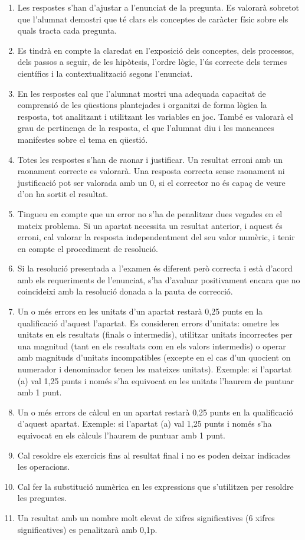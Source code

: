 \begin{enumerate}
  \item Les respostes s'han d'ajustar a l'enunciat de la pregunta. Es valorarà sobretot que l'alumnat demostri que té clars els conceptes de caràcter físic sobre els quals tracta cada pregunta.
  \item Es tindrà en compte la claredat en l'exposició dels conceptes, dels processos, dels passos a seguir, de les hipòtesis, l'ordre lògic, l'ús correcte dels termes científics i la contextualització segons l'enunciat.
  \item En les respostes cal que l'alumnat mostri una adequada capacitat de comprensió de les qüestions plantejades i organitzi de forma lògica la resposta, tot analitzant i utilitzant les variables en joc. També es valorarà el grau de pertinença de la resposta, el que l'alumnat diu i les mancances manifestes sobre el tema en qüestió.
  \item Totes les respostes s'han de raonar i justificar. Un resultat erroni amb un raonament correcte es valorarà. Una resposta correcta sense raonament ni justificació pot ser valorada amb un 0, si el corrector no és capaç de veure d'on ha sortit el resultat.
  \item Tingueu en compte que un error no s'ha de penalitzar dues vegades en el mateix problema. Si un apartat necessita un resultat anterior, i aquest és erroni, cal valorar la resposta independentment del seu valor numèric, i tenir en compte el procediment de resolució.
  \item Si la resolució presentada a l'examen és diferent però correcta i està d'acord amb els requeriments de l'enunciat, s'ha d'avaluar positivament encara que no coincideixi amb la resolució donada a la pauta de correcció.
  \item Un o més errors en les unitats d'un apartat restarà 0,25 punts en la qualificació d'aquest l'apartat. Es consideren errors d'unitats: ometre les unitats en els resultats (finals o intermedis), utilitzar unitats incorrectes per una magnitud (tant en els resultats com en els valors intermedis) o operar amb magnituds d'unitats incompatibles (excepte en el cas d'un quocient on numerador i denominador tenen les mateixes unitats). Exemple: si l'apartat (a) val 1,25 punts i només s'ha equivocat en les unitats l'haurem de puntuar amb 1 punt.
  \item Un o més errors de càlcul en un apartat restarà 0,25 punts en la qualificació d'aquest apartat. Exemple: si l'apartat (a) val 1,25 punts i només s'ha equivocat en els càlculs l'haurem de puntuar amb 1 punt.
  \item Cal resoldre els exercicis fins al resultat final i no es poden deixar indicades les operacions.
  \item Cal fer la substitució numèrica en les expressions que s'utilitzen per resoldre les preguntes.
  \item Un resultat amb un nombre molt elevat de xifres significatives (6 xifres significatives) es penalitzarà amb 0,1p.
\end{enumerate}
